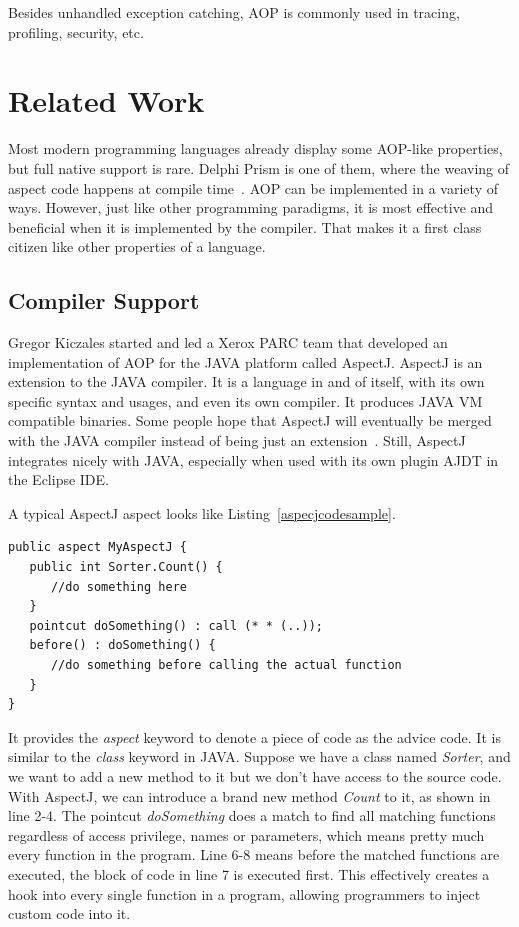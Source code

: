 Besides unhandled exception catching, AOP is commonly used in tracing, profiling, security, etc.

\section{Related Work}Most modern programming languages already display some AOP-like properties, but full native support is rare. Delphi Prism is one of them, where the weaving of aspect code happens at compile time~\cite{delphi_prism2010}. AOP can be implemented in a variety of ways. However, just like other programming paradigms, it is most effective and beneficial when it is implemented by the compiler. That makes it a first class citizen like other properties of a language.

\subsection{Compiler Support}

Gregor Kiczales started and led a Xerox PARC team that developed an implementation of AOP for the JAVA platform called AspectJ\cite{aop}. AspectJ is an extension to the JAVA compiler. It is a language in and of itself, with its own specific syntax and usages, and even its own compiler. It produces JAVA VM compatible binaries. Some people hope that AspectJ will eventually be merged with the JAVA compiler instead of being just an extension~\cite{aspectj_faq}. Still, AspectJ integrates nicely with JAVA, especially when used with its own plugin AJDT in the Eclipse IDE.

A typical AspectJ aspect looks like Listing~\ref{aspecjcodesample}.

\begin{lstlisting}[caption={sample AspectJ code}, label=aspecjcodesample]
public aspect MyAspectJ {
   public int Sorter.Count() {
      //do something here
   }
   pointcut doSomething() : call (* * (..));
   before() : doSomething() {
      //do something before calling the actual function
   }
}
\end{lstlisting}

It provides the {\em aspect} keyword to denote a piece of code as the advice code. It is similar to the {\em class} keyword in JAVA. Suppose we have a class named {\em Sorter}, and we want to add a new method to it but we don't have access to the source code. With AspectJ, we can introduce a brand new method {\em Count} to it, as shown in line 2-4. The pointcut {\em doSomething} does a match to find all matching functions regardless of access privilege, names or parameters, which means pretty much every function in the program. Line 6-8 means before the matched functions are executed, the block of code in line 7 is executed first. This effectively creates a hook into every single function in a program, allowing programmers to inject custom code into it.

